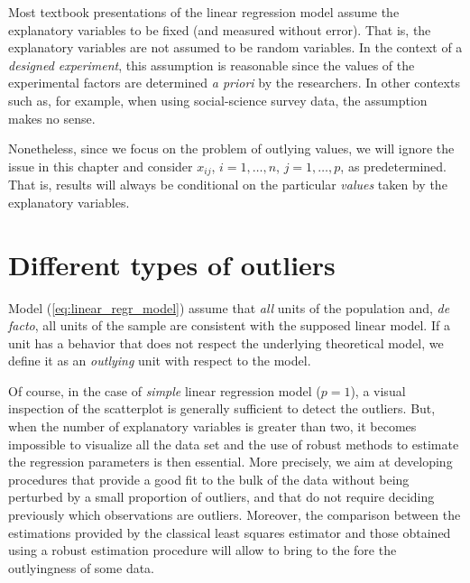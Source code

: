\begin{stremark}
Most textbook presentations of the linear regression model assume the
explanatory variables to be fixed (and measured without error). That is, the
explanatory variables are not assumed to be random variables. In the context of
a \emph{designed experiment}, this assumption is reasonable since the values of
the experimental factors are determined \emph{a priori} by the researchers. In
other contexts such as, for example, when using social-science survey data, the
assumption makes no sense. 

Nonetheless, since we focus on the problem of outlying values, we will ignore
the issue in this chapter and consider $x_{ij}$, $i = 1, \dots, n$, $j = 1,
\dots, p$, as predetermined. That is, results will always be conditional on the
particular \emph{values} taken by the explanatory variables.
\end{stremark}


\section{Different types of outliers}

Model (\ref{eq:linear_regr_model}) assume that \emph{all} units of the
population and, \emph{de facto}, all units of the sample are consistent with
the supposed linear model. If a unit has a behavior that does not respect the
underlying theoretical model, we define it as an \emph{outlying} unit with
respect to the model.

Of course, in the case of \emph{simple} linear regression model ($p=1$), a
visual inspection of the scatterplot is generally sufficient to detect the
outliers. But, when the number of explanatory variables is greater than two,
it becomes impossible to visualize all the data set and the use of robust
methods to estimate the regression parameters is then essential. More
precisely, we aim at developing procedures that provide a good fit to the bulk
of the data without being perturbed by a small proportion of outliers, and
that do not require deciding previously which observations are outliers.
Moreover, the comparison between the estimations provided by the classical
least squares estimator and those obtained using a robust estimation procedure
will allow to bring to the fore the outlyingness of some data.

